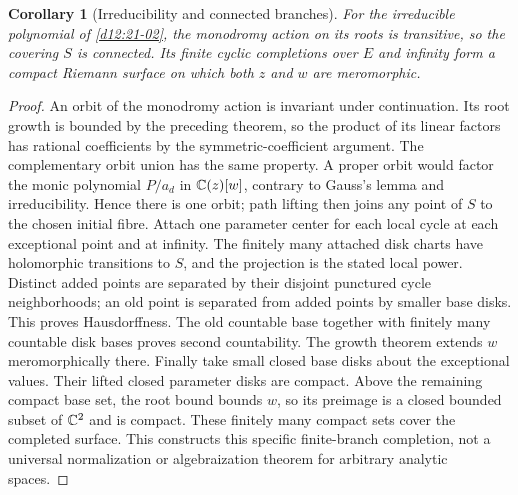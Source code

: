 \documentclass[11pt,a4paper,openany]{book}
\newtheorem{corollary}[theorem]{Corollary}
\theoremstyle{definition}
\theoremstyle{remark}\newtheorem{remark}[theorem]{Remark}
\begin{document}
\begin{corollary}[Irreducibility and connected branches]\label{d12:21:transitivity}
For the irreducible polynomial of \cref{d12:21-02}, the monodromy action
on its roots is transitive, so the covering $S$ is connected. Its finite
cyclic completions over $E$ and infinity form a compact Riemann surface
on which both $z$ and $w$ are meromorphic.
\end{corollary}
\begin{proof}
An orbit of the monodromy action is invariant under continuation. Its
root growth is bounded by the preceding theorem, so the product of its
linear factors has rational coefficients by the symmetric-coefficient
argument. The complementary orbit union has the same property. A proper
orbit would factor the monic polynomial $P/a_d$ in $\mathbb C(z)[w]$, contrary
to Gauss's lemma and irreducibility. Hence there is one orbit; path
lifting then joins any point of $S$ to the chosen initial fibre.
Attach one parameter center for each local cycle at each exceptional
point and at infinity. The finitely many attached disk charts have
holomorphic transitions to $S$, and the projection is the stated local
power. Distinct added points are separated by their disjoint punctured
cycle neighborhoods; an old point is separated from added points by
smaller base disks. This proves Hausdorffness. The old countable base
together with finitely many countable disk bases proves second
countability. The growth theorem extends $w$ meromorphically there.
Finally take small closed base disks about the exceptional values.
Their lifted closed parameter disks are compact. Above the remaining
compact base set, the root bound bounds $w$, so its preimage is a closed
bounded subset of $\mathbb C^2$ and is compact. These finitely many compact
sets cover the completed surface. This constructs this specific
finite-branch completion, not a universal normalization or algebraization
theorem for arbitrary analytic spaces.
\end{proof}
\end{document}
